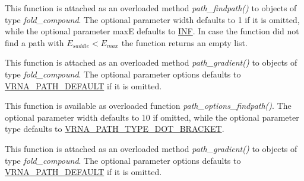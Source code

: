 \begin{DoxyRefList}
\item[Global \mbox{\hyperlink{group__paths__direct_gad00765c2f269fddfa319310af22d4f67}{vrna\+\_\+path\+\_\+findpath\+\_\+ub}} (vrna\+\_\+fold\+\_\+compound\+\_\+t $\ast$fc, const char $\ast$s1, const char $\ast$s2, int width, int maxE)]\label{wrappers__wrappers000121}%
%
 This function is attached as an overloaded method {\itshape path\+\_\+findpath()} to objects of type {\itshape fold\+\_\+compound}. The optional parameter {\ttfamily width} defaults to 1 if it is omitted, while the optional parameter {\ttfamily maxE} defaults to \mbox{\hyperlink{constants_8h_a12c2040f25d8e3a7b9e1c2024c618cb6}{I\+NF}}. In case the function did not find a path with $E_{saddle} < E_{max}$ the function returns an empty list.  
\item[Global \mbox{\hyperlink{group__paths__walk_ga9594d7424dbe301f0dd3f4900db0f05c}{vrna\+\_\+path\+\_\+gradient}} (vrna\+\_\+fold\+\_\+compound\+\_\+t $\ast$vc, short $\ast$pt, unsigned int options)]\label{wrappers__wrappers000134}%
%
 This function is attached as an overloaded method {\itshape path\+\_\+gradient()} to objects of type {\itshape fold\+\_\+compound}. The optional parameter {\ttfamily options} defaults to \mbox{\hyperlink{group__paths__walk_gaf1bb1f8fec8d24e3b821f621b19f77b4}{V\+R\+N\+A\+\_\+\+P\+A\+T\+H\+\_\+\+D\+E\+F\+A\+U\+LT}} if it is omitted.  
\item[Global \mbox{\hyperlink{group__paths__direct_ga3790a24ca64d68acfa6e67b525151a5f}{vrna\+\_\+path\+\_\+options\+\_\+findpath}} (int width, unsigned int type)]\label{wrappers__wrappers000124}%
%
 This function is available as overloaded function {\itshape path\+\_\+options\+\_\+findpath()}. The optional parameter {\ttfamily width} defaults to 10 if omitted, while the optional parameter {\ttfamily type} defaults to \mbox{\hyperlink{group__paths_ga3e964156b52440b65fae5e2a48750d8e}{V\+R\+N\+A\+\_\+\+P\+A\+T\+H\+\_\+\+T\+Y\+P\+E\+\_\+\+D\+O\+T\+\_\+\+B\+R\+A\+C\+K\+ET}}.  
\item[Global \mbox{\hyperlink{group__paths__walk_ga98fdc3f5cfa36a12738c2ec1ce024570}{vrna\+\_\+path\+\_\+random}} (vrna\+\_\+fold\+\_\+compound\+\_\+t $\ast$vc, short $\ast$pt, unsigned int steps, unsigned int options)]\label{wrappers__wrappers000135}%
%
 This function is attached as an overloaded method {\itshape path\+\_\+gradient()} to objects of type {\itshape fold\+\_\+compound}. The optional parameter {\ttfamily options} defaults to \mbox{\hyperlink{group__paths__walk_gaf1bb1f8fec8d24e3b821f621b19f77b4}{V\+R\+N\+A\+\_\+\+P\+A\+T\+H\+\_\+\+D\+E\+F\+A\+U\+LT}} if it is omitted.  

\end{DoxyRefList}
